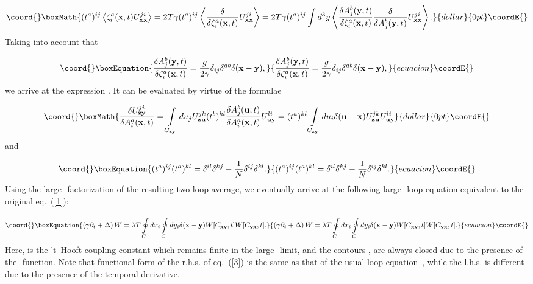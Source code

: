 \documentclass[a4paper,12pt]{article}
\begin{document}
$$\coord{}\boxMath{
(t^a)^{ij}\left<\zeta_i^a({\bf x},t)U_{\bf xx}^{ji}\right>=
2T\gamma(t^a)^{ij}\left<\frac{\delta}{\delta\zeta_i^a({\bf x},t)}U_{\bf xx}^{ji}\right>=
2T\gamma(t^a)^{ij}\int d^3y\left<\frac{\delta A_j^b({\bf y},t)}{\delta\zeta_i^a({\bf x},t)}
\frac{\delta}{\delta A_j^b({\bf y},t)}U_{\bf xx}^{ji}\right>.}{dollar}{0pt}\coordE{}$$
Taking into account that~\cite{zj}

\begin{equation}\coord{}\boxEquation{
\label{deriv}
\frac{\delta A_j^b({\bf y},t)}{\delta\zeta_i^a({\bf x},t)}=\frac{g}{2\gamma}
\delta_{ij}\delta^{ab}\delta({\bf x}-{\bf y}),
}{
\frac{\delta A_j^b({\bf y},t)}{\delta\zeta_i^a({\bf x},t)}=\frac{g}{2\gamma}
\delta_{ij}\delta^{ab}\delta({\bf x}-{\bf y}),
}{ecuacion}\coordE{}\end{equation}
we arrive at the expression
\coordHE{}. It can be evaluated by virtue of the formulae

$$\coord{}\boxMath{
\frac{\delta U_{\bf zy}^{ji}}{\delta A_i^a({\bf x},t)}=\int\limits_{C_{\bf zy}}^{}du_jU_{\bf zu}^{jk}(t^b)^{kl}
\frac{\delta A_j^b({\bf u},t)}{\delta A_i^a({\bf x},t)}U_{\bf uy}^{li}=(t^a)^{kl}\int\limits_{C_{\bf zy}}^{}du_i\delta({\bf u}-{\bf x})
U_{\bf zu}^{jk}U_{\bf uy}^{li}}{dollar}{0pt}\coordE{}$$
and

\begin{equation}\coord{}\boxEquation{
\label{tt}
(t^a)^{ij}(t^a)^{kl}=\delta^{il}\delta^{kj}-\frac{1}{N}\delta^{ij}\delta^{kl}.
}{
(t^a)^{ij}(t^a)^{kl}=\delta^{il}\delta^{kj}-\frac{1}{N}\delta^{ij}\delta^{kl}.
}{ecuacion}\coordE{}\end{equation}
Using the large-\coordHE{} factorization of the resulting two-loop average,
we eventually arrive at the
following large-\coordHE{} loop equation equivalent to the original eq.~(\ref{1}):

\begin{equation}\coord{}\boxEquation{
\label{3}
\left(\gamma\partial_t+\Delta\right)W=\lambda T\oint\limits_{C}^{}dx_i\oint\limits_{C}^{}dy_i\delta({\bf x}-{\bf y})
W[C_{\bf xy},t]W[C_{\bf yx},t].
}{
\left(\gamma\partial_t+\Delta\right)W=\lambda T\oint\limits_{C}^{}dx_i\oint\limits_{C}^{}dy_i\delta({\bf x}-{\bf y})
W[C_{\bf xy},t]W[C_{\bf yx},t].
}{ecuacion}\coordE{}\end{equation}
Here, \coordHE{} is the 't~Hooft coupling constant which remains finite in the large-\coordHE{} limit,
and the contours \coordHE{}, \coordHE{} are always closed due to the presence of the \myHighlight{$\delta$}\coordHE{}-function.
Note that functional form of the r.h.s. of eq.~(\ref{3}) is the same as that of the usual loop equation~\cite{le},
while the l.h.s. is different due to the presence of the temporal derivative.
\end{document}
